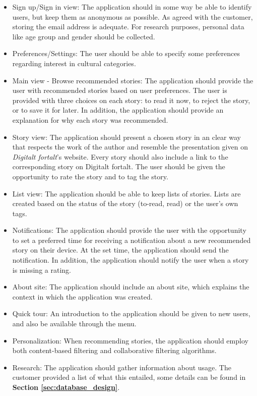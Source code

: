 \begin{itemize}
	\item Sign up/Sign in view: The application should in some way be able to identify users, but keep them as anonymous as possible. As agreed with the customer, storing the email address is adequate. For research purposes, personal data like age group and gender should be collected.
	
	\item Preferences/Settings: The user should be able to specify some preferences regarding interest in cultural categories.
	
	\item Main view - Browse recommended stories: The application should provide the user with recommended stories based on user preferences. The user is provided with three choices on each story: to read it now, to reject the story, or to save it for later. In addition, the application should provide an explanation for why each story was recommended.
	
	\item Story view: The application should present a chosen story in an clear way that respects the work of the author and resemble the presentation given on \textit{Digitalt fortalt}'s website. Every story should also include a link to the corresponding story on Digitalt fortalt. The user should be given the opportunity to rate the story and to tag the story. 
	
	\item List view: The application should be able to keep lists of stories. Lists are created based on the status of the story (to-read, read) or the user's own tags.
	
	\item Notifications: The application should provide the user with the opportunity to set a preferred time for receiving a notification about a new recommended story on their device. At the set time, the application should send the notification. In addition, the application should notify the user when a story is missing a rating.
	
	\item About site: The application should include an about site, which explains the context in which the application was created.
	
	\item Quick tour: An introduction to the application should be given to new users, and also be available through the menu.  
	
	\item Personalization: When recommending stories, the application should employ both content-based filtering and collaborative filtering algorithms.
	
	\item Research: The application should gather information about usage. The customer provided a list of what this entailed, some details can be found in \textbf{Section \ref{sec:database_design}}.
\end{itemize}


